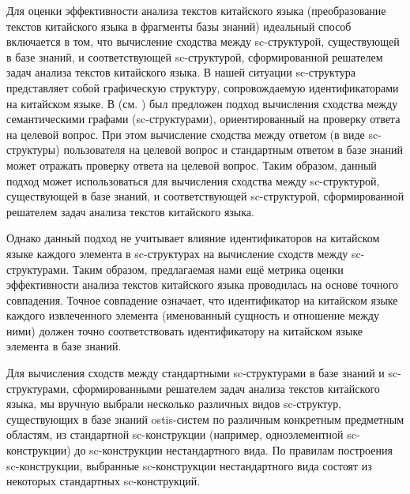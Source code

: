 Для оценки эффективности анализа текстов китайского языка (преобразование текстов китайского языка в фрагменты базы знаний) идеальный способ включается в том, что вычисление сходства между sc-структурой, существующей в базе знаний, и соответствующей sc-структурой, сформированной решателем задач анализа текстов китайского языка. В нашей ситуации sc-структура представляет собой графическую структуру, сопровождаемую идентификаторами на китайском языке. В (см. ) был предложен подход вычисления сходства между семантическими графами (sc-структурами), ориентированный на проверку ответа на целевой вопрос. При этом вычисление сходства между ответом (в виде sc-структуры) пользователя на целевой вопрос и стандартным ответом в базе знаний может отражать проверку ответа на целевой вопрос. Таким образом, данный подход может использоваться для вычисления сходства между sc-структурой, существующей в базе знаний, и соответствующей sc-структурой, сформированной решателем задач анализа текстов китайского языка. 

Однако данный подход не учитывает влияние идентификаторов на китайском языке каждого элемента в sc-структурах на вычисление сходств между sc-структурами. Таким образом, предлагаемая нами ещё метрика оценки эффективности анализа текстов китайского языка проводилась на основе точного совпадения. Точное совпадение означает, что идентификатор на китайском языке каждого извлеченного элемента (именованный сущность и отношение между ними) должен точно соответствовать идентификатору на китайском языке элемента в базе знаний. 

Для вычисления сходств между стандартными sc-структурами в базе знаний и sc-структурами, сформированными решателем задач анализа текстов китайского языка, мы вручную выбрали несколько различных видов sc-структур, существующих в базе знаний ostis-систем по различным конкретным предметным областям, из стандартной sc-конструкции (например, одноэлементной sc-конструкции) до sc-конструкции нестандартного вида. По правилам построения sc-конструкции, выбранные sc-конструкции нестандартного вида состоят из некоторых стандартных sc-конструкций.

